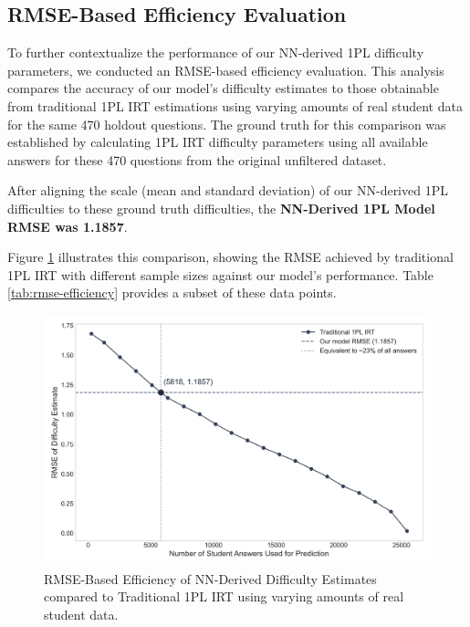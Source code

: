 \documentclass[
    a4paper, %
    10pt, %
    twoside, %
]{LTJournalArticle}
\begin{document}
\subsection{RMSE-Based Efficiency Evaluation}
To further contextualize the performance of our NN-derived 1PL difficulty parameters, we conducted an RMSE-based efficiency evaluation. This analysis compares the accuracy of our model's difficulty estimates to those obtainable from traditional 1PL IRT estimations using varying amounts of real student data for the same 470 holdout questions. The ground truth for this comparison was established by calculating 1PL IRT difficulty parameters using all available answers for these 470 questions from the original unfiltered dataset.

After aligning the scale (mean and standard deviation) of our NN-derived 1PL difficulties to these ground truth difficulties, the \textbf{NN-Derived 1PL Model RMSE was 1.1857}.

Figure \ref{fig:rmse-efficiency} illustrates this comparison, showing the RMSE achieved by traditional 1PL IRT with different sample sizes against our model's performance. Table \ref{tab:rmse-efficiency} provides a subset of these data points.

\begin{figure}[H]
    \centering
    \includegraphics[width=1\columnwidth]{figures/rmse_efficiency_curve.png}
    \caption{RMSE-Based Efficiency of NN-Derived Difficulty Estimates compared to Traditional 1PL IRT using varying amounts of real student data.}
    \label{fig:rmse-efficiency}
\end{figure}
\end{document}
